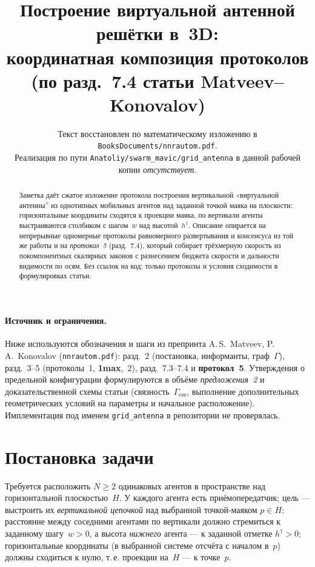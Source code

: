 \documentclass[12pt,a4paper]{article}
\title{Построение виртуальной антенной решётки в~3D:\\
координатная композиция протоколов (по разд.~7.4 статьи Matveev--Konovalov)}
\author{Текст восстановлен по математическому изложению в \texttt{BooksDocuments/nnrautom.pdf}.\\
Реализация по пути \texttt{Anatoliy/swarm\_mavic/grid\_antenna} в данной рабочей копии \emph{отсутствует}.}
\date{}
\begin{document}
\maketitle

\begin{abstract}
Заметка даёт сжатое изложение протокола построения вертикальной «виртуальной антенны'' из однотипных мобильных агентов над заданной точкой маяка на плоскости: горизонтальные координаты сходятся к проекции маяка, по вертикали агенты выстраиваются столбиком с шагом~$w$ над высотой~$h^\dagger$. Описание опирается на непрерывные одномерные протоколы равномерного развертывания и консенсуса из той же работы и на \emph{протокол~5} (разд.~7.4), который собирает трёхмерную скорость из покомпонентных скалярных законов с разнесением бюджета скорости и дальности видимости по осям. Без ссылок на код: только протоколы и условия сходимости в формулировках статьи.
\end{abstract}

\paragraph{Источник и ограничения.}
Ниже используются обозначения и шаги из препринта A.\,S.~Matveev, P.\,A.~Konovalov (\texttt{nnrautom.pdf}): разд.~2 (постановка, информанты, граф~$\Gamma$), разд.~3--5 (протоколы~1, \textbf{1max},~2), разд.~7.3--7.4 и \textbf{протокол~5}. Утверждения о предельной конфигурации формулируются в объёме \emph{предложения~2} и доказательственной схемы статьи (связность~$\Gamma_{\mathrm{ess}}$, выполнение дополнительных геометрических условий на параметры и начальное расположение). Имплементация под именем \texttt{grid\_antenna} в репозитории не проверялась.

\section{Постановка задачи}

Требуется расположить $N\ge 2$ одинаковых агентов в пространстве над горизонтальной плоскостью~$H$. У каждого агента есть приёмопередатчик; цель --- выстроить их \emph{вертикальной цепочкой} над выбранной точкой-маяком $p\in H$: расстояние между соседними агентами по вертикали должно стремиться к заданному шагу~$w>0$, а высота \emph{нижнего} агента --- к заданной отметке $h^\dagger>0$; горизонтальные координаты (в выбранной системе отсчёта с началом в~$p$) должны сходиться к нулю, т.\,е. проекции на~$H$ --- к точке~$p$.
\end{document}
